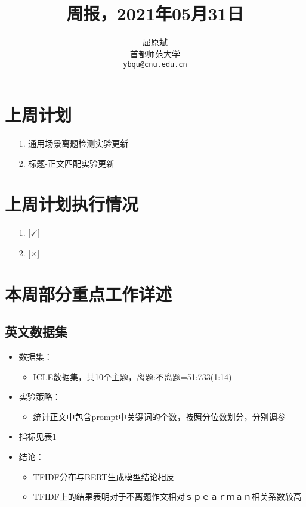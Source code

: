 \documentclass[11pt]{article}
\title{周报，2021年05月31日}
\author{屈原斌 \\
  首都师范大学 \\
    {\tt ybqu@cnu.edu.cn}}
\date{}
\begin{document}
\begin{CJK}{UTF8}{gkai}

\maketitle
\CJKindent

\section{上周计划}


\begin{itemize}
  \item [1.] 通用场景离题检测实验更新
  \item [2.] 标题-正文匹配实验更新
\end{itemize}


\section{上周计划执行情况}
\begin{itemize}
\item [1.] [$\checkmark$]
\item [2.] [$\times$] 
\end{itemize}

\section{本周部分重点工作详述}

\subsection{英文数据集}

\begin{itemize}
  \item 数据集：
  \begin{itemize}
    \item ICLE数据集，共10个主题，离题:不离题=51:733(1:14)
  \end{itemize}
  \item 实验策略：
  \begin{itemize}
    \item 统计正文中包含prompt中关键词的个数，按照分位数划分，分别调参
  \end{itemize}
  \item 指标见表1
  \item 结论：
  \begin{itemize}
    \item TFIDF分布与BERT生成模型结论相反
    \item TFIDF上的结果表明对于不离题作文相对ｓｐｅａｒｍａｎ相关系数较高
  \end{itemize}
\end{itemize}


\end{CJK}
\end{document}
